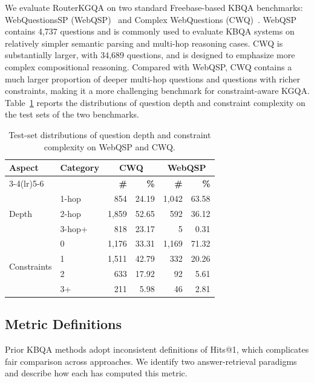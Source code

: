 \documentclass[11pt]{article}
\begin{document}
We evaluate RouterKGQA on two standard Freebase-based KBQA benchmarks: WebQuestionsSP (WebQSP)~\citep{yih-etal-2016-value} and Complex WebQuestions (CWQ)~\citep{talmor-berant-2018-web}. WebQSP contains 4,737 questions and is commonly used to evaluate KBQA systems on relatively simpler semantic parsing and multi-hop reasoning cases. CWQ is substantially larger, with 34,689 questions, and is designed to emphasize more complex compositional reasoning. Compared with WebQSP, CWQ contains a much larger proportion of deeper multi-hop questions and questions with richer constraints, making it a more challenging benchmark for constraint-aware KGQA. Table~\ref{tab:test_complexity_stats} reports the distributions of question depth and constraint complexity on the test sets of the two benchmarks.

\begin{table}[!htbp]
\centering
\small
\setlength{\tabcolsep}{4pt}
\begin{tabular}{llrrrr}
\toprule
\textbf{Aspect} & \textbf{Category} & \multicolumn{2}{c}{\textbf{CWQ}} & \multicolumn{2}{c}{\textbf{WebQSP}} \\
\cmidrule(lr){3-4}\cmidrule(lr){5-6}
 &  & \textbf{\#} & \textbf{\%} & \textbf{\#} & \textbf{\%} \\
\midrule
\multirow[c]{3}{*}{Depth}
& 1-hop   & 854  & 24.19 & 1,042 & 63.58 \\
& 2-hop   & 1,859 & 52.65 & 592   & 36.12 \\
& 3-hop+  & 818  & 23.17 & 5     & 0.31 \\
\midrule
\multirow[c]{4}{*}{Constraints}
& 0       & 1,176 & 33.31 & 1,169 & 71.32 \\
& 1       & 1,511 & 42.79 & 332   & 20.26 \\
& 2       & 633   & 17.92 & 92    & 5.61 \\
& 3+      & 211   & 5.98  & 46    & 2.81 \\
\bottomrule
\end{tabular}
\caption{Test-set distributions of question depth and constraint complexity on WebQSP and CWQ.}
\label{tab:test_complexity_stats}
\end{table}

\subsection{Metric Definitions}
\label{app:metric_details}

Prior KBQA methods adopt inconsistent definitions of Hits@1, which complicates fair comparison across approaches. We identify two answer-retrieval paradigms and describe how each has computed this metric.
\end{document}
